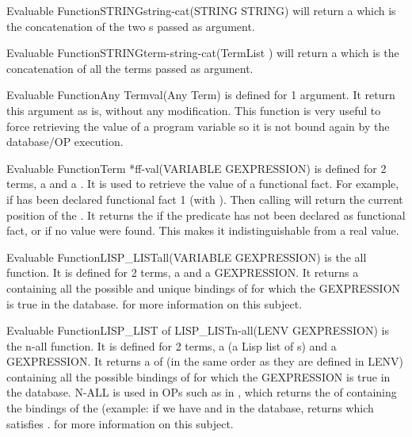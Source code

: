 \begin{typeefa}{Evaluable Function}{STRING}{string-cat}{(STRING STRING)} 
will return a  which is the concatenation of the two
s passed as argument.
\end{typeefa}

\begin{typeefa}{Evaluable Function}{STRING}{term-string-cat}{(TermList )} 
  will return a  which is the concatenation of all the terms
  passed as argument.
\end{typeefa}

\begin{typeefa}{Evaluable Function}{Any Term}{val}{(Any Term)}
is defined for 1 argument. It return this argument as is, without any
modification. This function is very useful to force retrieving the value of a
program variable so it is not bound again by the database/OP execution.
\end{typeefa}

\begin{typeefa}{Evaluable Function}{Term *}{ff-val}{(VARIABLE GEXPRESSION)}
is defined for 2 terms, a  and a . It is used
to retrieve the value of a functional fact.  For example, if 
has been declared functional fact 1 (with ).  Then
calling  will return the current
 position of the .  It returns the 
 if the predicate has not been declared as functional 
fact, or if no value were found. This makes it indistinguishable from a
 real value.
\end{typeefa}

\begin{typeefa}{Evaluable Function}{LISP\_LIST}{all}{(VARIABLE GEXPRESSION)}
is the all function. It is defined for 2 terms, a  and a
GEXPRESSION.  It returns a  containing all the possible and
unique bindings of  for which the GEXPRESSION is true in the
database.  for more information on
this subject.
\end{typeefa}

\begin{typeefa}{Evaluable Function}{LISP\_LIST of LISP\_LIST}{n-all}{(LENV GEXPRESSION)}
is the n-all function. It is defined for 2 terms, a  (a
Lisp list of
s) and a GEXPRESSION. It returns a  of
 (in the same order as they are defined in LENV) containing all
the possible bindings of  for which the GEXPRESSION is true in the
database. N-ALL is used in OPs such as in , which returns the  of 
containing the bindings of the  (example: if we have  and  in the database, returns  which satisfies .  for more information on this subject.
\end{typeefa}

